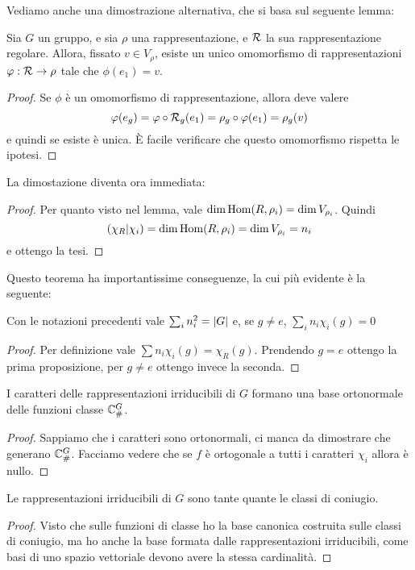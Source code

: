 Vediamo anche una dimostrazione alternativa, che si basa sul seguente lemma:
\begin{mylemma}
  Sia $G$ un gruppo, e sia $\rho$ una rappresentazione, e $\mathcal R$ la sua rappresentazione regolare. Allora, fissato $v\in V_\rho$, esiste un unico omomorfismo di rappresentazioni $\varphi: \mathcal R \rightarrow \rho$ tale che $\phi(e_1)=v$.
\end{mylemma}
\begin{proof}
  Se $\phi$ è un omomorfismo di rappresentazione, allora deve valere 
  \[
  \varphi(e_g)=\varphi \circ \mathcal R_g (e_1) = \rho_g \circ \varphi (e_1) = \rho_g(v)
  \]
  e quindi se esiste è unica. \`E facile verificare che questo omomorfismo rispetta le ipotesi.
\end{proof}

La dimostazione diventa ora immediata:
\begin{proof}
  Per quanto visto nel lemma, vale $\dim \operatorname{Hom}(R,\rho_i) = \dim V_{\rho_i}$. Quindi
  \[
  \left(\chi_R | \chi_i\right)= \dim \operatorname{Hom}(R,\rho_i) = \dim V_{\rho_i} = n_i
  \]
  e ottengo la tesi.
\end{proof}

Questo teorema ha importantissime conseguenze, la cui più evidente è la seguente:
\begin{myprop}
  Con le notazioni precedenti vale $\sum_i n_i^2 = \left|G\right|$ e, se $g\ne e$, $\sum_i n_i \chi_i(g)=0$
\end{myprop}
\begin{proof}
  Per definizione vale $\sum n_i \chi_i(g) = \chi_R(g)$. Prendendo $g=e$ ottengo la prima proposizione, per $g\ne e$ ottengo invece la seconda.
\end{proof}

\begin{mytheorem}
  I caratteri delle rappresentazioni irriducibili di $G$ formano una base ortonormale delle funzioni classe $\mathbb C^{G}_\#$.
\end{mytheorem}

\begin{proof}
  Sappiamo che i caratteri sono ortonormali, ci manca da dimostrare che generano $\mathbb C^{G}_\#$. Facciamo vedere che se $f$ è ortogonale a tutti i caratteri $\chi_i$ allora è nullo.
  
  
\end{proof}


\begin{mytheorem}
  Le rappresentazioni irriducibili di $G$ sono tante quante le classi di coniugio.
\end{mytheorem}

\begin{proof}
  Visto che sulle funzioni di classe ho la base canonica costruita sulle classi di coniugio, ma ho anche la base formata dalle rappresentazioni irriducibili, come basi di uno spazio vettoriale devono avere la stessa cardinalità.
\end{proof}






